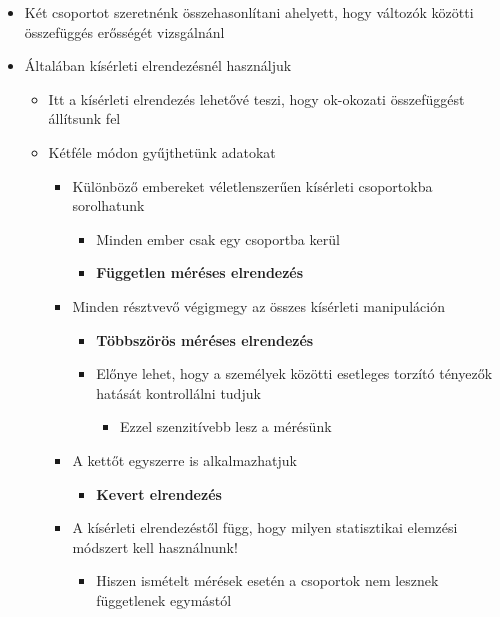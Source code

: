 \documentclass[
  letterpaper,
  DIV=11,
  numbers=noendperiod]{scrreprt}
\providecommand{\tightlist}{%
  \setlength{\itemsep}{0pt}\setlength{\parskip}{0pt}}\usepackage{longtable,booktabs,array}
\begin{document}
\begin{itemize}
\item
  Két csoportot szeretnénk összehasonlítani ahelyett, hogy változók
  közötti összefüggés erősségét vizsgálnánl
\item
  Általában kísérleti elrendezésnél használjuk

  \begin{itemize}
  \item
    Itt a kísérleti elrendezés lehetővé teszi, hogy ok-okozati
    összefüggést állítsunk fel
  \item
    Kétféle módon gyűjthetünk adatokat

    \begin{itemize}
    \item
      Különböző embereket véletlenszerűen kísérleti csoportokba
      sorolhatunk

      \begin{itemize}
      \item
        Minden ember csak egy csoportba kerül
      \item
        \textbf{Független méréses elrendezés}
      \end{itemize}
    \item
      Minden résztvevő végigmegy az összes kísérleti manipuláción

      \begin{itemize}
      \item
        \textbf{Többszörös méréses elrendezés}
      \item
        Előnye lehet, hogy a személyek közötti esetleges torzító
        tényezők hatását kontrollálni tudjuk

        \begin{itemize}
        \tightlist
        \item
          Ezzel szenzitívebb lesz a mérésünk
        \end{itemize}
      \end{itemize}
    \item
      A kettőt egyszerre is alkalmazhatjuk

      \begin{itemize}
      \tightlist
      \item
        \textbf{Kevert elrendezés}
      \end{itemize}
    \item
      A kísérleti elrendezéstől függ, hogy milyen statisztikai elemzési
      módszert kell használnunk!

      \begin{itemize}
      \tightlist
      \item
        Hiszen ismételt mérések esetén a csoportok nem lesznek
        függetlenek egymástól
      \end{itemize}
    \end{itemize}
  \end{itemize}
\end{itemize}
\end{document}
